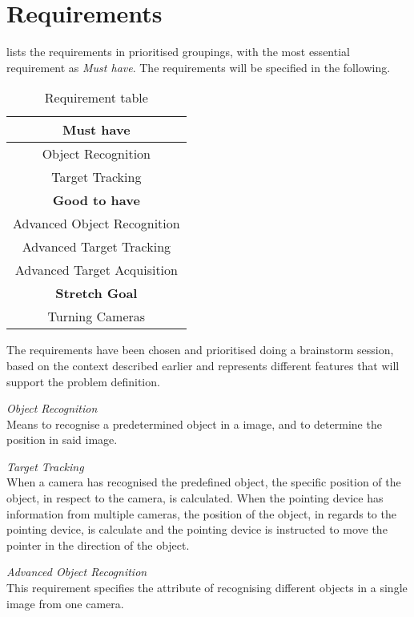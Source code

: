 \section{Requirements}\label{sec:requirements}
 lists the requirements in prioritised groupings, with the most essential requirement as \textit{Must have}. The requirements will be specified in the following.

\begin{table}[h]
    \centering
    \begin{tabular}{|c|}
    \hline
     \textbf{Must have} \\ \hline
     Object Recognition \\ \hline
     Target Tracking \\ \hline\hline
     \textbf{Good to have} \\ \hline
     Advanced Object Recognition \\ \hline
     Advanced Target Tracking \\ \hline
     Advanced Target Acquisition\\ \hline\hline
     \textbf{Stretch Goal} \\ \hline
     Turning Cameras \\ \hline 
    \end{tabular}
    \caption{Requirement table}
    \label{tbl:requirement}
\end{table}

The requirements have been chosen and prioritised doing a brainstorm session, based on the context described earlier and represents different features that will support the problem definition.

\emph{Object Recognition}\\
Means to recognise a predetermined object in a image, and to determine the position in said image. 

\emph{Target Tracking}\\
When a camera has recognised the predefined object, the specific position of the object, in respect to the camera, is calculated. When the pointing device has information from multiple cameras, the position of the object, in regards to the pointing device, is calculate and the pointing device is instructed to move the pointer in the direction of the object.

\emph{Advanced Object Recognition}\\
This requirement specifies the attribute of recognising different objects in a single image from one camera.


